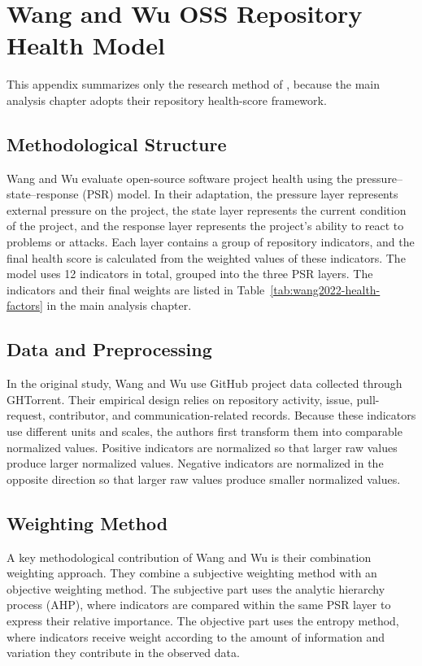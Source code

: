 \documentclass[12pt,a4paper]{report}
\begin{document}
\section{Wang and Wu OSS Repository Health Model}\label{app:wang2022-health-model}

This appendix summarizes only the research method of \textcite{wangMethodEvaluateHealth2022}, because the main analysis chapter adopts their repository health-score framework.

\subsection{Methodological Structure}

Wang and Wu evaluate open-source software project health using the pressure--state--response (PSR) model. In their adaptation, the pressure layer represents external pressure on the project, the state layer represents the current condition of the project, and the response layer represents the project's ability to react to problems or attacks. Each layer contains a group of repository indicators, and the final health score is calculated from the weighted values of these indicators. The model uses 12 indicators in total, grouped into the three PSR layers. The indicators and their final weights are listed in Table~\ref{tab:wang2022-health-factors} in the main analysis chapter.

\subsection{Data and Preprocessing}

In the original study, Wang and Wu use GitHub project data collected through GHTorrent. Their empirical design relies on repository activity, issue, pull-request, contributor, and communication-related records. Because these indicators use different units and scales, the authors first transform them into comparable normalized values. Positive indicators are normalized so that larger raw values produce larger normalized values. Negative indicators are normalized in the opposite direction so that larger raw values produce smaller normalized values.

\subsection{Weighting Method}

A key methodological contribution of Wang and Wu is their combination weighting approach. They combine a subjective weighting method with an objective weighting method. The subjective part uses the analytic hierarchy process (AHP), where indicators are compared within the same PSR layer to express their relative importance. The objective part uses the entropy method, where indicators receive weight according to the amount of information and variation they contribute in the observed data.
\end{document}
